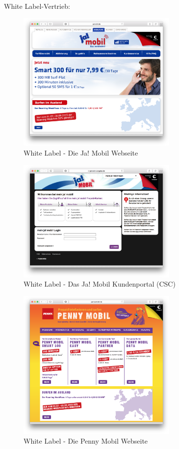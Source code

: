 \documentclass[11pt,a4paper]{article} %
\begin{document}
\pagebreak
White Label-Vertrieb:


\begin{figure}[H]
\includegraphics[width=0.7\textwidth]{images/Sites/White_Label/Ja_Mobil.png}
\centering
\caption{White Label - Die Ja! Mobil Webseite \cite{ja}}
\end{figure}

\begin{figure}[H]
\includegraphics[width=0.7\textwidth]{images/Sites/White_Label/Ja_Mobil_CSC.png}
\centering
\caption{White Label - Das Ja! Mobil Kundenportal (CSC) \cite{jacsc}}
\end{figure}


\begin{figure}[H]
\includegraphics[width=0.7\textwidth]{images/Sites/White_Label/Penny_Mobil.png}
\centering
\caption{White Label - Die Penny Mobil Webseite \cite{penny}}
\end{figure}
\end{document}
